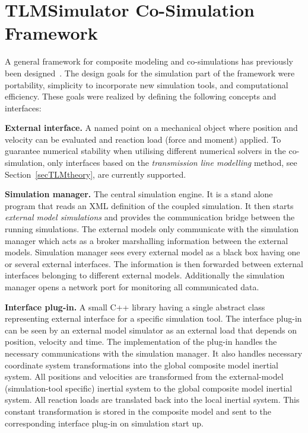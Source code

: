 \chapter{TLMSimulator Co-Simulation Framework}
\label{framework}
A general framework for composite modeling and co-simulations has previously been designed~\cite{Siemers+Nakhimovski+Fritzson-05}. 
The design goals for the simulation part of the framework were portability, simplicity to incorporate new simulation tools, and computational efficiency.
These goals were realized by defining the following concepts and interfaces:

\textbf{External interface.} 
A named point on a mechanical object where position and velocity can be evaluated and reaction load (force and moment) applied. 
To guarantee numerical stability when utilising different numerical solvers in the co-simulation, only interfaces based on the {\em transmission line modelling} method, see Section~\ref{secTLMtheory}, are currently supported.

\textbf{Simulation manager.} 
The central simulation engine. 
It is a stand alone program that reads an XML definition of the coupled simulation.  
It then starts \emph{external model simulations} and provides the communication bridge between the running simulations. 
The external models only communicate with the simulation manager which acts as a broker marshalling information between the external models. 
Simulation manager sees every external model as a black box having one or several external interfaces. 
The information is then forwarded between external interfaces belonging to different external models. 
Additionally the simulation manager opens a network port for monitoring all communicated data.

\textbf{Interface plug-in.} 
A small C++ library having a single abstract class representing external interface for a specific simulation tool. 
The interface plug-in can be seen by an external model simulator as an external load that depends on position, velocity
and time. 
The implementation of the plug-in handles the necessary communications with the simulation manager. 
It also handles necessary coordinate system transformations into the global composite model inertial system. 
All positions and velocities are transformed from the external-model (simulation-tool specific) inertial system to the
global composite model inertial system. 
All reaction loads are translated back into the local inertial system. 
This constant transformation is stored in the composite model and sent to the corresponding interface plug-in on simulation start up.

